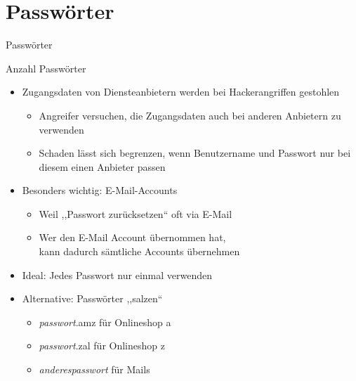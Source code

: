 \section{Passwörter}
\begin{frame}{Passwörter}


\end{frame}

\begin{frame}{Anzahl Passwörter}
  \begin{itemize}
    \item Zugangsdaten von Diensteanbietern werden bei Hackerangriffen gestohlen
    \begin{itemize}
      \item Angreifer versuchen, die Zugangsdaten auch bei anderen Anbietern zu verwenden
      \item Schaden lässt sich begrenzen, wenn Benutzername und Passwort nur bei diesem einen Anbieter passen
    \end{itemize}
    \item Besonders wichtig: E-Mail-Accounts
    \begin{itemize}
      \item Weil ,,Passwort zurücksetzen`` oft via E-Mail
      \item Wer den E-Mail Account übernommen hat,\\ kann dadurch sämtliche Accounts übernehmen
    \end{itemize}
    \item Ideal: Jedes Passwort nur einmal verwenden
    \item Alternative: Passwörter ,,salzen``
    \begin{itemize}
      \item \textit{passwort}.amz für Onlineshop a
      \item \textit{passwort}.zal für Onlineshop z
      \item \textit{anderespasswort} für Mails
    \end{itemize}
  \end{itemize}
\end{frame}

